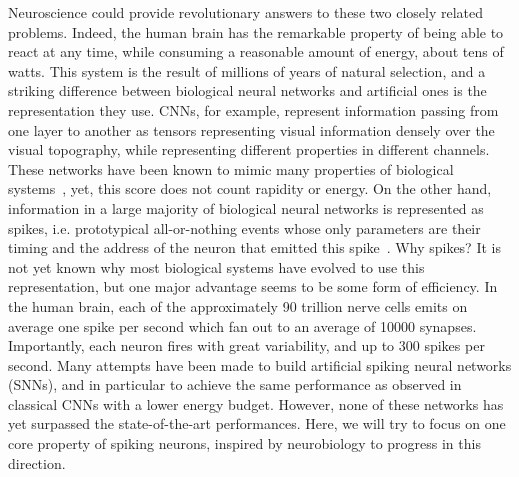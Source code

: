 \documentclass[default]{sn-jnl}%
\theoremstyle{thmstyleone}%
\theoremstyle{thmstyletwo}%
\theoremstyle{thmstylethree}%
\begin{document}
Neuroscience could provide revolutionary answers to these two closely related problems. Indeed, the human brain has the remarkable property of being able to react at any time, while consuming a reasonable amount of energy, about tens of watts. This system is the result of millions of years of natural selection, and a striking difference between biological neural networks and artificial ones is the representation they use. CNNs, for example, represent information passing from one layer to another as tensors representing visual information densely over the visual topography, while representing different properties in different channels. These networks have been known to mimic many properties of biological systems~\citep{schrimpf_brain-score_2020}, yet, this score does not count rapidity or energy. On the other hand, information in a large majority of biological neural networks is represented as spikes, i.e. prototypical all-or-nothing events whose only parameters are their timing and the address of the neuron that emitted this spike~\citep{paugam-moisy_computing_2012}. Why spikes? It is not yet known why most biological systems have evolved to use this representation, but one major advantage seems to be some form of efficiency. In the human brain, each of the approximately 90 trillion nerve cells emits on average one spike per second which fan out to an average of 10000 synapses. Importantly, each neuron fires with great variability, and up to 300 spikes per second. Many attempts have been made to build artificial spiking neural networks (SNNs), and in particular to achieve the same performance as observed in classical CNNs with a lower energy budget. However, none of these networks has yet surpassed the state-of-the-art performances. Here, we will try to focus on one core property of spiking neurons, inspired by neurobiology to progress in this direction.
%
\end{document}
